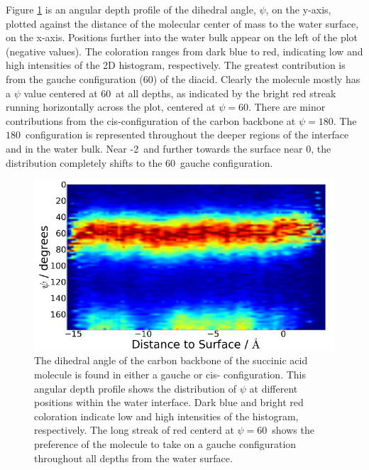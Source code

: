 Figure \ref{fig:dihedral} is an angular depth profile of the dihedral angle, $\psi$, on the y-axis, plotted against the distance of the molecular center of mass to the water surface, on the x-axis. Positions further into the water bulk appear on the left of the plot (negative values). The coloration ranges from dark blue to red, indicating low and high intensities of the 2D histogram, respectively. The greatest contribution is from the gauche configuration (60\textdegree) of the diacid. Clearly the molecule mostly has a $\psi$ value centered at 60\textdegree~at all depths, as indicated by the bright red streak running horizontally across the plot, centered at $\psi=60$\textdegree. There are minor contributions from the cis-configuration of the carbon backbone at $\psi = 180$\textdegree. The $180$\textdegree~configuration is represented throughout the deeper regions of the interface and in the water bulk. Near -2\angs~and further towards the surface near 0\angs, the distribution completely shifts to the $60$\textdegree~gauche configuration.


\begin{figure}[h!]
	\begin{center}
		\includegraphics[scale=1.0]{images/dihedral/dihedral-small.png}
		\caption{The dihedral angle of the carbon backbone of the succinic acid molecule is found in either a gauche or cis- configuration. This angular depth profile shows the distribution of $\psi$ at different positions within the water interface. Dark blue and bright red coloration indicate low and high intensities of the histogram, respectively. The long streak of red centerd at $\psi=60$\textdegree~shows the preference of the molecule to take on a gauche configuration throughout all depths from the water surface.}
		\label{fig:dihedral}
	\end{center}
\end{figure}


